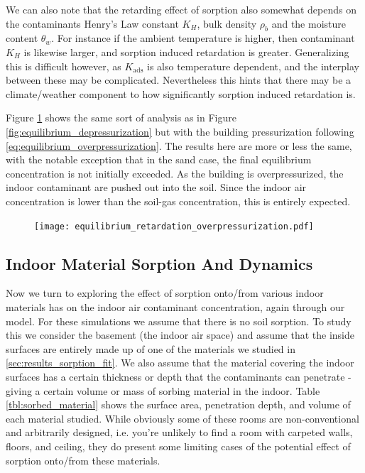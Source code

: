 We can also note that the retarding effect of sorption also somewhat depends on the contaminants Henry's Law constant $K_H$, bulk density $\rho_b$ and the moisture content $\theta_w$.
For instance if the ambient temperature is higher, then contaminant $K_H$ is likewise larger, and sorption induced retardation is greater.
Generalizing this is difficult however, as $K_\mathrm{ads}$ is also temperature dependent, and the interplay between these may be complicated.
Nevertheless this hints that there may be a climate/weather component to how significantly sorption induced retardation is.\par

Figure \ref{fig:equilibrium_overpressurization} shows the same sort of analysis as in Figure \ref{fig:equilibrium_depressurization} but with the building pressurization following \eqref{eq:equilibrium_overpressurization}.
The results here are more or less the same, with the notable exception that in the sand case, the final equilibrium concentration is not initially exceeded.
As the building is overpressurized, the indoor contaminant are pushed out into the soil.
Since the indoor air concentration is lower than the soil-gas concentration, this is entirely expected.\par

\begin{figure}[!htb]
  \texttt{[image: equilibrium\_retardation\_overpressurization.pdf]}
  \caption{}
  \label{fig:equilibrium_overpressurization}
\end{figure}


\subsection{Indoor Material Sorption And Dynamics}\label{sec:results_indoor_sorption}

Now we turn to exploring the effect of sorption onto/from various indoor materials has on the indoor air contaminant concentration, again through our model.
For these simulations we assume that there is no soil sorption.
To study this we consider the basement (the indoor air space) and assume that the inside surfaces are entirely made up of one of the materials we studied in \ref{sec:results_sorption_fit}.
We also assume that the material covering the indoor surfaces has a certain thickness or depth that the contaminants can penetrate - giving a certain volume or mass of sorbing material in the indoor.
Table \ref{tbl:sorbed_material} shows the surface area, penetration depth, and volume of each material studied.
While obviously some of these rooms are non-conventional and arbitrarily designed, i.e. you're unlikely to find a room with carpeted walls, floors, and ceiling, they do present some limiting cases of the potential effect of sorption onto/from these materials.\par

